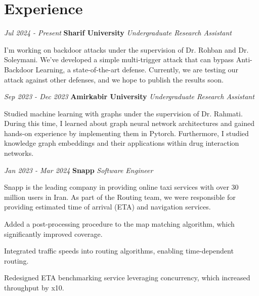 \section{Experience}


\begin{twocolentry}
	{\textit{Jul 2024 - Present}}
	\textbf{Sharif University}
	\textit{Undergraduate Research Assistant}
\end{twocolentry}

\begin{onecolentry}
	I'm working on backdoor attacks under the supervision of Dr. Rohban and Dr. Soleymani. We've developed a simple multi-trigger attack that can bypass Anti-Backdoor Learning, a state-of-the-art defense. Currently, we are testing our attack against other defenses, and we hope to publish the results soon. 
\end{onecolentry}

\vspace{0.20cm}

\begin{twocolentry}
	{\textit{Sep 2023 - Dec 2023}}
	\textbf{Amirkabir University}
	\textit{Undergraduate Research Assistant}
\end{twocolentry}


\begin{onecolentry}
	Studied machine learning with graphs under the supervision of Dr. Rahmati.
	During this time, I learned about graph neural network architectures and gained hands-on experience by implementing them in Pytorch. Furthermore, I studied knowledge graph embeddings and their applications within drug interaction networks. 
\end{onecolentry}

\vspace{0.20cm}

\begin{twocolentry}
	{\textit{Jan 2023 - Mar 2024}}
	\textbf{Snapp}
	\textit{Software Engineer}
\end{twocolentry}


\begin{onecolentry}
	Snapp is the leading company in providing online taxi services with over 30 million users in Iran. As part of the Routing team, we were responsible for providing estimated time of arrival (ETA) and navigation services. 
	
	\begin{highlights}
		\item Added a post-processing procedure to the map matching algorithm, which significantly improved coverage.
		\item Integrated traffic speeds into routing algorithms, enabling time-dependent routing. 
		\item Redesigned ETA benchmarking service leveraging concurrency, which increased  throughput by x10.
		
	\end{highlights}
	
\end{onecolentry}

